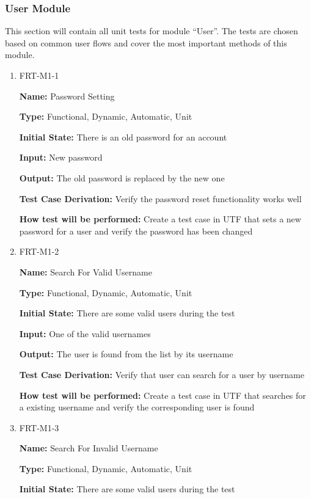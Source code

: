 \documentclass[12pt, titlepage]{article}
\begin{document}
\subsubsection{User Module}

This section will contain all unit tests for module ``User''. The tests are chosen based on common user flows and cover the most important methods of this module.

\begin{enumerate}

\item{FRT-M1-1}

\textbf{Name:} Password Setting

\textbf{Type:} Functional, Dynamic, Automatic, Unit
					
\textbf{Initial State:} There is an old password for an account
					
\textbf{Input:} New password
					
\textbf{Output:} The old password is replaced by the new one

\textbf{Test Case Derivation:} Verify the password reset functionality works well

\textbf{How test will be performed:} Create a test case in UTF that sets a new password for a user and verify the password has been changed

\item{FRT-M1-2}

\textbf{Name:} Search For Valid Username

\textbf{Type:} Functional, Dynamic, Automatic, Unit
					
\textbf{Initial State:} There are some valid users during the test
					
\textbf{Input:} One of the valid usernames
					
\textbf{Output:} The user is found from the list by its username

\textbf{Test Case Derivation:} Verify that user can search for a user by username

\textbf{How test will be performed:} Create a test case in UTF that searches for a existing username and verify the corresponding user is found

\item{FRT-M1-3}

\textbf{Name:} Search For Invalid Username

\textbf{Type:} Functional, Dynamic, Automatic, Unit
					
\textbf{Initial State:} There are some valid users during the test
					

\end{enumerate}
\end{document}
